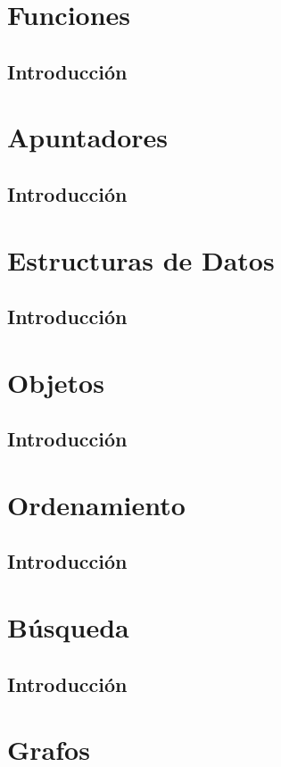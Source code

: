 \documentclass{beamer}
\begin{document}
\section{Funciones}
\subsection{Introducci\'on}

\section{Apuntadores}
\subsection{Introducci\'on}

\section{Estructuras de Datos}
\subsection{Introducci\'on}

\section{Objetos}
\subsection{Introducci\'on}

\section{Ordenamiento}
\subsection{Introducci\'on}

\section{B\'usqueda}
\subsection{Introducci\'on}

\section{Grafos}
\end{document}
